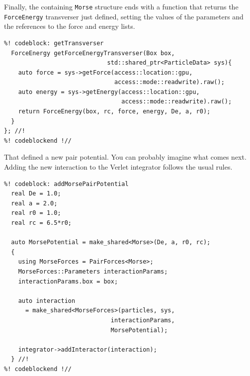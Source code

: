 Finally, the containing \texttt{Morse} structure ends with a function that 
returns the \texttt{ForceEnergy} transverser just defined, setting the values of 
the parameters and the references to the force and energy lists.
\begin{lstlisting}
%! codeblock: getTransverser
  ForceEnergy getForceEnergyTransverser(Box box,
                             std::shared_ptr<ParticleData> sys){
    auto force = sys->getForce(access::location::gpu,
                               access::mode::readwrite).raw();
    auto energy = sys->getEnergy(access::location::gpu,
                                 access::mode::readwrite).raw();
    return ForceEnergy(box, rc, force, energy, De, a, r0);
  }
}; //!
%! codeblockend !//
\end{lstlisting}

That defined a new pair potential. You can probably imagine what comes next.
Adding the new interaction to the Verlet integrator follows the usual rules.
\begin{lstlisting}
%! codeblock: addMorsePairPotential
  real De = 1.0;
  real a = 2.0;
  real r0 = 1.0;
  real rc = 6.5*r0;

  auto MorsePotential = make_shared<Morse>(De, a, r0, rc);
  {
    using MorseForces = PairForces<Morse>;
    MorseForces::Parameters interactionParams;
    interactionParams.box = box;

    auto interaction
      = make_shared<MorseForces>(particles, sys,
                              interactionParams,
                              MorsePotential);

    integrator->addInteractor(interaction);
  } //!
%! codeblockend !//
\end{lstlisting}

